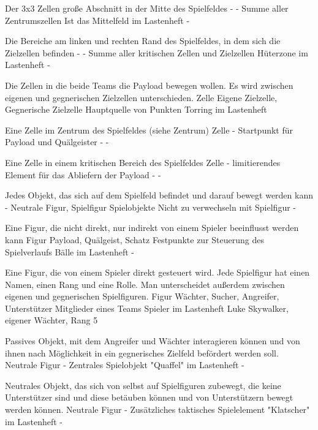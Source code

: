 {Der 3x3 Zellen große Abschnitt in der Mitte des Spielfeldes}
{-}
{-}
{Summe aller Zentrumszellen}
{Ist das Mittelfeld im Lastenheft}
{-}

{Die Bereiche am linken und rechten Rand des Spielfeldes, in dem sich die Zielzellen befinden}
{-}
{-}
{Summe aller kritischen Zellen und Zielzellen}
{Hüterzone im Lastenheft}
{-}

{Die Zellen in die beide Teams die Payload bewegen wollen. Es wird zwischen eigenen und gegnerischen Zielzellen unterschieden.}
{Zelle}
{Eigene Zielzelle, Gegnerische Zielzelle}
{Hauptquelle von Punkten}
{Torring im Lastenheft}
{}

{Eine Zelle im Zentrum des Spielfeldes (siehe Zentrum)}
{Zelle}
{-}
{Startpunkt für Payload und Quälgeister}
{-}
{-}

{Eine Zelle in einem kritischen Bereich des Spielfeldes}
{Zelle}
{-}
{limitierendes Element für das Abliefern der Payload}
{-}
{-}

{Jedes Objekt, das sich auf dem Spielfeld befindet und darauf bewegt werden kann}
{-}
{Neutrale Figur, Spielfigur}
{Spielobjekte}
{Nicht zu verwechseln mit Spielfigur}
{-}

{Eine Figur, die nicht direkt, nur indirekt von einem Spieler beeinflusst werden kann}
{Figur}
{Payload, Quälgeist, Schatz}
{Festpunkte zur Steuerung des Spielverlaufs}
{Bälle im Lastenheft}
{-}

{Eine Figur, die von einem Spieler direkt gesteuert wird. Jede Spielfigur hat einen Namen, einen Rang und eine Rolle. Man unterscheidet außerdem zwischen eigenen und gegnerischen Spielfiguren.}
{Figur}
{Wächter, Sucher, Angreifer, Unterstützer}
{Mitglieder eines Teams}
{Spieler im Lastenheft}
{Luke Skywalker, eigener Wächter, Rang 5}

{Passives Objekt, mit dem Angreifer und Wächter interagieren können und von ihnen nach Möglichkeit in ein gegnerisches Zielfeld befördert werden soll.}
{Neutrale Figur}
{-}
{Zentrales Spielobjekt}
{"Quaffel" im Lastenheft}
{-}

{Neutrales Objekt, das sich von selbst auf Spielfiguren zubewegt, die keine Unterstützer sind und diese betäuben können und von Unterstützern bewegt werden können.}
{Neutrale Figur}
{-}
{Zusätzliches taktisches Spielelement}
{"Klatscher" im Lastenheft}
{-}

